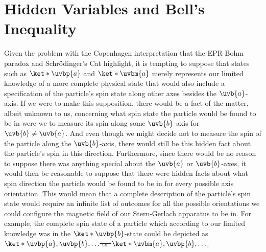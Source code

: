 \documentclass[12pt]{report}
\providecommand{\DIFadd}[1]{{\protect\color{blue}\uwave{#1}}} %
\providecommand{\DIFdel}[1]{{\protect\color{red}\sout{#1}}}                      %
\providecommand{\DIFaddbegin}{} %
\providecommand{\DIFaddend}{} %
\providecommand{\DIFdelbegin}{} %
\providecommand{\DIFdelend}{} %
\begin{document}
\section{Hidden Variables and Bell's Inequality\label{hiddenbellsection}}
Given the problem with the Copenhagen interpretation that the EPR-Bohm paradox and Schr\"{o}dinger's Cat highlight, it is tempting to suppose that states such as $\ket*{\uvbp{a}}$ and $\ket*{\uvbm{a}}$ merely represents our limited knowledge of a more complete physical state that would also include a specification of the particle's spin state along other axes besides the $\uvb{a}$-axis. If we were to make this supposition, there would be a fact of the matter, albeit unknown to us, concerning what spin state the particle would be found to be in  were we to measure its spin along some $\uvb{b}$-axis for $\uvb{b}\neq\uvb{a}$. And  even though we might decide not to measure the spin of the particle along the $\uvb{b}$-axis, there would still be this hidden fact about the particle's spin in this direction. Furthermore, since there would be no reason to suppose there was anything special about the $\uvb{a}$ or $\uvb{b}$-axes, it would then be reasonable to suppose that there were hidden facts about what spin direction the particle would be found to be in for every possible axis orientation. This would mean that a complete description of the particle's spin state would require an infinite list of outcomes for all the possible orientations we could configure the magnetic field of our Stern-Gerlach apparatus to be in. For example, the complete spin state of a particle which according to our limited knowledge was in the $\ket*{\uvbp{b}}$-state could be depicted as \DIFdelbegin \DIFdel{$\ket*{\uvbp{a},\uvbp{b},\ldots}$ or  $\ket*{\uvbm{a},\uvbp{b},\ldots}$}\DIFdelend \DIFaddbegin \DIFadd{$\ket*{\uvbp{a};\uvbp{b};\ldots}$ or  $\ket*{\uvbm{a};\uvbp{b};\ldots}$}\DIFaddend ,  %
\DIFdelbegin %
\DIFdelend \DIFaddbegin {}\DIFaddend %
\end{document}
